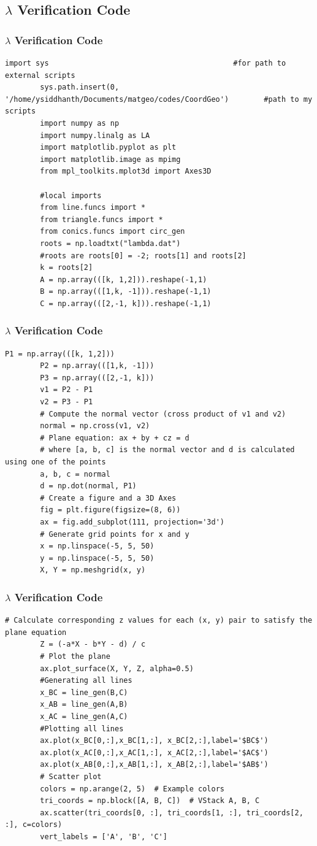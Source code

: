 \documentclass{beamer}
\theoremstyle{remark}
\numberwithin{equation}{section}
\begin{document}
\subsection{$\lambda$ Verification Code}
\begin{frame}[fragile]
	\frametitle{$\lambda$ Verification Code}
	\begin{lstlisting}[mathescape=true]
		import sys                                          #for path to external scripts
		sys.path.insert(0, '/home/ysiddhanth/Documents/matgeo/codes/CoordGeo')        #path to my scripts
		import numpy as np
		import numpy.linalg as LA
		import matplotlib.pyplot as plt
		import matplotlib.image as mpimg
		from mpl_toolkits.mplot3d import Axes3D
		
		#local imports
		from line.funcs import *
		from triangle.funcs import *
		from conics.funcs import circ_gen
		roots = np.loadtxt("lambda.dat")
		#roots are roots[0] = -2; roots[1] and roots[2]
		k = roots[2]
		A = np.array(([k, 1,2])).reshape(-1,1) 
		B = np.array(([1,k, -1])).reshape(-1,1)  
		C = np.array(([2,-1, k])).reshape(-1,1)  
	\end{lstlisting}
\end{frame}
\begin{frame}[fragile]
	\frametitle{$\lambda$ Verification Code}
	\begin{lstlisting}[mathescape=true]
		P1 = np.array(([k, 1,2]))
		P2 = np.array(([1,k, -1]))
		P3 = np.array(([2,-1, k]))
		v1 = P2 - P1
		v2 = P3 - P1
		# Compute the normal vector (cross product of v1 and v2)
		normal = np.cross(v1, v2)
		# Plane equation: ax + by + cz = d
		# where [a, b, c] is the normal vector and d is calculated using one of the points
		a, b, c = normal
		d = np.dot(normal, P1)
		# Create a figure and a 3D Axes
		fig = plt.figure(figsize=(8, 6))
		ax = fig.add_subplot(111, projection='3d')
		# Generate grid points for x and y
		x = np.linspace(-5, 5, 50)
		y = np.linspace(-5, 5, 50)
		X, Y = np.meshgrid(x, y)
	\end{lstlisting}
\end{frame}
\begin{frame}[fragile]
	\frametitle{$\lambda$ Verification Code}
	\begin{lstlisting}[mathescape=true]
		# Calculate corresponding z values for each (x, y) pair to satisfy the plane equation
		Z = (-a*X - b*Y - d) / c
		# Plot the plane
		ax.plot_surface(X, Y, Z, alpha=0.5)
		#Generating all lines
		x_BC = line_gen(B,C)
		x_AB = line_gen(A,B)
		x_AC = line_gen(A,C)
		#Plotting all lines
		ax.plot(x_BC[0,:],x_BC[1,:], x_BC[2,:],label='$BC$')
		ax.plot(x_AC[0,:],x_AC[1,:], x_AC[2,:],label='$AC$')
		ax.plot(x_AB[0,:],x_AB[1,:], x_AB[2,:],label='$AB$')
		# Scatter plot
		colors = np.arange(2, 5)  # Example colors
		tri_coords = np.block([A, B, C])  # VStack A, B, C
		ax.scatter(tri_coords[0, :], tri_coords[1, :], tri_coords[2, :], c=colors)
		vert_labels = ['A', 'B', 'C']
	\end{lstlisting}
\end{frame}
\end{document}
